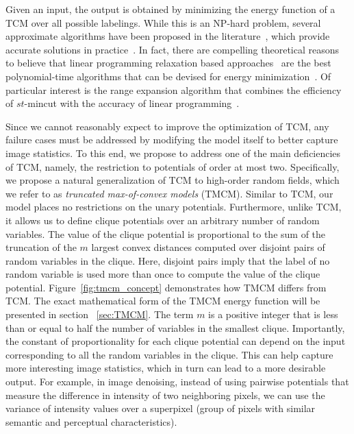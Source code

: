 \documentclass[runningheads]{llncs}
\begin{document}
Given an input, the output is obtained by minimizing the energy function of a TCM over all possible labelings. While this
is an NP-hard problem, several approximate algorithms have been proposed
in the literature~\cite{boykovpami01,chekurisoda01,guptastoc00,kolmogorovpami06,komodakisiccv07,komodakiscvpr07,kumarnips08,vekslercvpr07},
which provide accurate solutions in practice~\cite{szeliskipami08}.
In fact, there are compelling theoretical reasons to believe that linear programming relaxation based approaches~\cite{chekurisoda01,kolmogorovpami06,kumarnips08}
are the best polynomial-time algorithms that can be devised for energy minimization~\cite{manokaranstoc08}.
Of particular interest is the range expansion algorithm that combines the efficiency of
$st$-{\sc mincut} with the accuracy of linear programming~\cite{kumarnips08}.

Since we cannot reasonably expect to improve the optimization of TCM, any failure cases must be addressed by modifying the
model itself to better capture image statistics. To this end, we propose to address one of the main deficiencies of
TCM, namely, the restriction to potentials of order at most two. Specifically, we propose a natural generalization of
TCM to high-order random fields, which we refer to as {\em truncated max-of-convex models} (TMCM). 
Similar to TCM, our model places no restrictions on the unary potentials.
Furthermore, unlike TCM, it allows us to define clique potentials over an arbitrary number of random variables.
The value of the clique potential is proportional to the sum of the truncation of the $m$ largest convex distances computed over disjoint pairs
of random variables in the clique. Here, 
disjoint pairs imply that the label of no random variable is used more than once to
compute the value of the clique potential. Figure~\ref{fig:tmcm_concept} demonstrates how TMCM differs from TCM. The exact mathematical form of the TMCM energy function will be presented in section ~\ref{sec:TMCM}.
The term $m$ is a positive integer that is less than or equal to half the number of variables in the smallest clique.
Importantly, the constant of proportionality for each clique potential can depend on the input
corresponding to all the random variables in the clique. This can help capture more interesting image statistics, which in turn can lead to
a more desirable output. For example, in image
denoising, instead of using pairwise potentials that measure the difference in intensity of two neighboring pixels, we can use the variance
of intensity values over a superpixel (group of pixels with similar semantic and perceptual characteristics).
\end{document}
